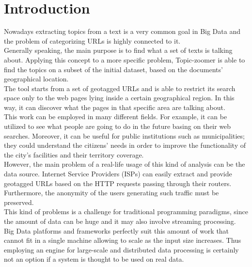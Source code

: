 \documentclass{sig-alternate-05-2015}
\begin{document}
\section{Introduction}
Nowadays extracting topics from a text is a very common goal in Big Data and the problem of categorizing URLs is highly connected to it.\\
Generally speaking, the main purpose is to find what a set of texts is talking about. Applying this concept to a more specific problem, Topic-zoomer is able to find the topics on a subset of the initial dataset, based on the documents' geographical location.\\
The tool starts from a set of geotagged URLs and is able to restrict its search space only to the web pages lying inside a certain geographical region. In this way, it can discover what the pages in that specific area are talking about.\\
This work can be employed in many different fields. For example, it can be utilized to see what people are going to do in the future basing on their web searches. Moreover, it can be useful for public institutions such as municipalities; they could understand the citizens' needs in order to improve the functionality of the city's facilities and their territory coverage.\\
However, the main problem of a real-life usage of this kind of analysis can be the data source. Internet Service Providers (ISPs) can easily extract and provide geotagged URLs based on the HTTP requests passing through their routers. Furthermore, the anonymity of the users generating such traffic must be preserved.\\
This kind of problems is a challenge for traditional programming paradigms, since the amount of data can be huge and it may also involve streaming  processing. Big Data platforms and frameworks perfectly suit this amount of work that cannot fit in a single machine allowing to scale as the input size increases. Thus employing an engine for large-scale and distributed data processing is certainly not an option if a system is thought to be used on real data.
\end{document}
